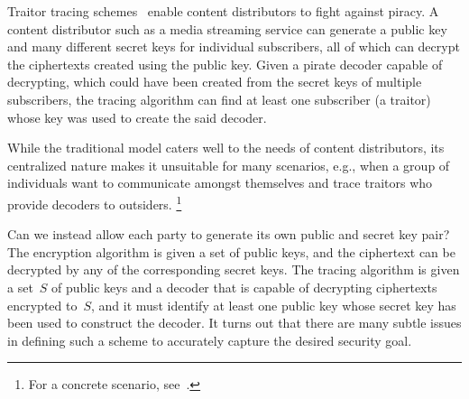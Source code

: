 Traitor tracing schemes~\cite{C:ChoFiaNao94} enable content distributors to fight against piracy.
A content distributor such as a media streaming service can generate a public key and many different secret keys for individual subscribers,
all of which can decrypt the ciphertexts created using the public key.
Given a pirate decoder capable of decrypting,
which could have been created from the secret keys of multiple subscribers,
the tracing algorithm can find at least one subscriber (a traitor) whose key was used to create the said decoder.

While the traditional model caters well to the needs of content distributors,
its centralized nature makes it unsuitable for many scenarios,
e.g., when a group of individuals want to communicate amongst themselves and trace traitors who provide decoders to outsiders.%
\footnote{For a concrete scenario, see~\cite{C:Zhandry21}.}

Can we instead allow each party to generate its own public and secret key pair?
The encryption algorithm is given a set of public keys, and the ciphertext can be decrypted by any of the corresponding secret keys.
The tracing algorithm is given a set~$S$ of public keys and a decoder that is capable of decrypting ciphertexts encrypted to~$S$, and it must identify at least one public key whose secret key has been used to construct the decoder.
It turns out that there are many subtle issues in defining such a scheme to accurately capture the desired security goal.

